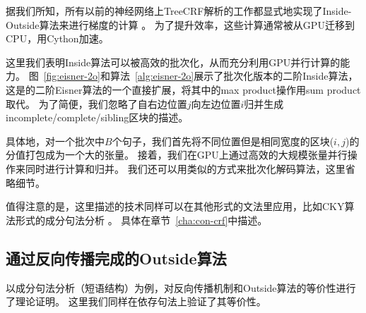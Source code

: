 

据我们所知，所有以前的神经网络上TreeCRF解析的工作都显式地实现了Inside-Outside算法来进行梯度的计算 \citep{zhang-etal-2019-empirical, jiang-etal-2018-supervised}。
为了提升效率，这些计算通常被从GPU迁移到CPU，用Cython加速。

这里我们表明Inside算法可以被高效的批次化，从而充分利用GPU并行计算的能力。
图~\ref{fig:eisner-2o}和算法~\ref{alg:eisner-2o}展示了批次化版本的二阶Inside算法，这是\citet{mcdonald-pereira-2006-online}的二阶Eisner算法的一个直接扩展，将其中的max product操作用sum product取代。
为了简便，我们忽略了自右边位置$j$向左边位置$i$归并生成incomplete/complete/sibling区块的描述。

具体地，对一个批次中$B$个句子，我们首先将不同位置但是相同宽度的区块($i, j$)的分值打包成为一个大的张量。
接着，我们在GPU上通过高效的大规模张量并行操作来同时进行计算和归并。
我们还可以用类似的方式来批次化解码算法，这里省略细节。

值得注意的是，这里描述的技术同样可以在其他形式的文法里应用，比如CKY算法形式的成分句法分析 \citep{finkel-etal-2008-efficient,drozdov-etal-2019-unsupervised}。
具体在章节~\ref{cha:con-crf}中描述。

\subsection{通过反向传播完成的Outside算法}

\citet{eisner-2016-inside}以成分句法分析（短语结构）为例，对反向传播机制和Outside算法的等价性进行了理论证明。
这里我们同样在依存句法上验证了其等价性。

